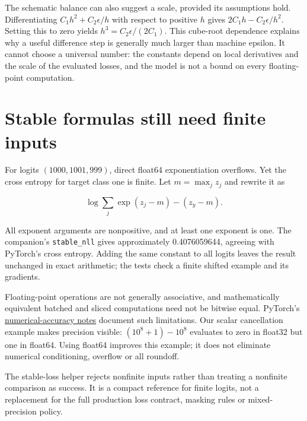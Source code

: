 The schematic balance can also suggest a scale, provided its assumptions
hold. Differentiating \(C_1h^2+C_2\epsilon/h\) with respect to positive
\(h\) gives \(2C_1h-C_2\epsilon/h^2\). Setting this to zero yields
\(h^3=C_2\epsilon/(2C_1)\). This cube-root dependence explains why a
useful difference step is generally much larger than machine epsilon. It
cannot choose a universal number: the constants depend on local
derivatives and the scale of the evaluated losses, and the model is not
a bound on every floating-point computation.

\section{Stable formulas still need finite
inputs}\label{stable-formulas-still-need-finite-inputs}

For logits \((1000,1001,999)\), direct float64 exponentiation overflows.
Yet the cross entropy for target class one is finite. Let
\(m=\max_jz_j\) and rewrite it as

\begin{equation}
\log\sum_j\exp(z_j-m)-(z_y-m).
\end{equation}

All exponent arguments are nonpositive, and at least one exponent is
one. The companion's \texttt{stable\_nll} gives approximately
0.4076059644, agreeing with PyTorch's cross entropy. Adding the same
constant to all logits leaves the result unchanged in exact arithmetic;
the tests check a finite shifted example and its gradients.

Floating-point operations are not generally associative, and
mathematically equivalent batched and sliced computations need not be
bitwise equal. PyTorch's
\href{https://docs.pytorch.org/docs/2.10/notes/numerical_accuracy.html}{numerical-accuracy
notes} document such limitations. Our scalar cancellation example makes
precision visible: \((10^8+1)-10^8\) evaluates to zero in float32 but
one in float64. Using float64 improves this example; it does not
eliminate numerical conditioning, overflow or all roundoff.

The stable-loss helper rejects nonfinite inputs rather than treating a
nonfinite comparison as success. It is a compact reference for finite
logits, not a replacement for the full production loss contract, masking
rules or mixed-precision policy.


